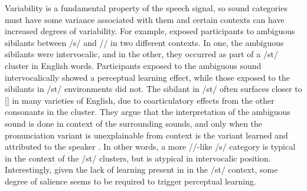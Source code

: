 Variability is a fundamental property of the speech signal, so sound categories must have some variance associated with them and certain contexts can have increased degrees of variability.
For example, \citet{Kraljic2008a} exposed participants to ambiguous sibilants between /s/ and /\textesh/ in two different contexts.  
In one, the ambiguous sibilants were intervocalic, and in the other, they occurred as part of a /st\textturnr/ cluster in English words.  
Participants exposed to the ambiguous sound intervocalically showed a perceptual learning effect, while those exposed to the sibilants in /st\textturnr/ environments did not.  
The sibilant in /st\textturnr/ often surfaces closer to [\textesh] in many varieties of English, due to coarticulatory effects from the other consonants in the cluster.  
They argue that the interpretation of the ambiguous sound is done in context of the surrounding sounds, and only when the pronunciation variant is unexplainable from context is the variant learned and attributed to the speaker \citep[see also][]{Kraljic2008}.
In other words, a more /\textesh/-like /s/ category is typical in the context of the /st\textturnr/ clusters, but is atypical in intervocalic position.
Interestingly, given the lack of learning present in in the /st\textturnr/ context, some degree of salience seems to be required to trigger perceptual learning.

